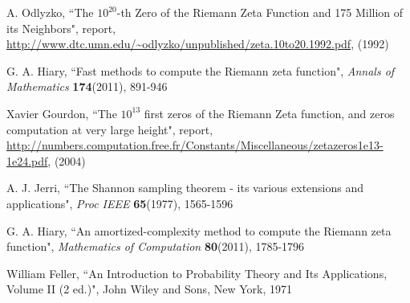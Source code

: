 \documentclass[twoside]{article}
\begin{document}
\begin{thebibliography}{10}
  A. Odlyzko,
``The $10^{20}$-th Zero of the Riemann Zeta
Function and 175 Million of its Neighbors", report,
\url{http://www.dtc.umn.edu/~odlyzko/unpublished/zeta.10to20.1992.pdf}, (1992)

 G. A. Hiary,
``Fast methods to compute the Riemann zeta function",
{\it Annals of Mathematics} {\bf174}(2011), 891-946

 Xavier Gourdon,
``The $10^{13}$ first zeros of the Riemann Zeta function,
and zeros computation at very large height", report,
\url{http://numbers.computation.free.fr/Constants/Miscellaneous/zetazeros1e13-1e24.pdf}, (2004)

 A. J. Jerri,
``The Shannon sampling theorem - its various extensions and applications",
{\it Proc IEEE} {\bf65}(1977), 1565-1596

 G. A. Hiary,
``An amortized-complexity method to compute the Riemann zeta function", 
{\it Mathematics of Computation} {\bf80}(2011), 1785-1796

 William Feller,
``An Introduction to Probability Theory and Its Applications, Volume II (2 ed.)",
John Wiley and Sons, New York, 1971


\end{thebibliography} 
\end{document}
